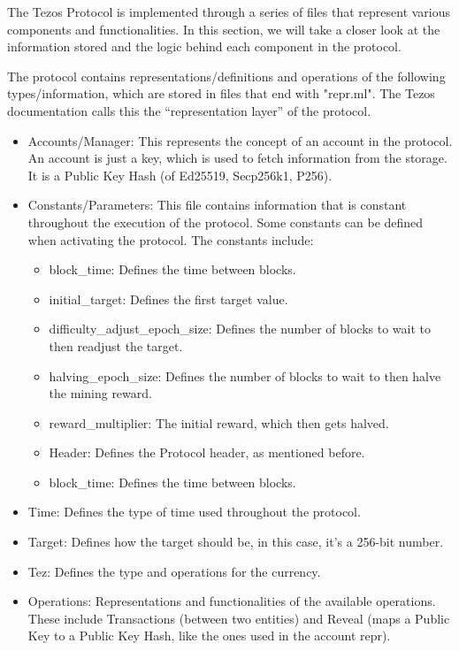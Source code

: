 The Tezos Protocol is implemented through a series of files that represent various components and functionalities. In this section, we will take a closer look at the information stored and the logic behind each component in the protocol.

The protocol contains representations/definitions and operations of the following types/information, which are stored in files that end with "repr.ml". The Tezos documentation calls this the ``representation layer'' of the protocol.

\begin{itemize}

    \item Accounts/Manager: This represents the concept of an account in the protocol. An account is just a key, which is used to fetch information from the storage. It is a Public Key Hash (of Ed25519, Secp256k1, P256).

    \item Constants/Parameters: This file contains information that is constant throughout the execution of the protocol. Some constants can be defined when activating the protocol. The constants include:

        \begin{itemize}
            \item block\_time: Defines the time between blocks.
            \item initial\_target: Defines the first target value.
            \item difficulty\_adjust\_epoch\_size: Defines the number of blocks to wait to then readjust the target.
            \item halving\_epoch\_size: Defines the number of blocks to wait to then halve the mining reward.
            \item reward\_multiplier: The initial reward, which then gets halved.
            \item Header: Defines the Protocol header, as mentioned before.
            \item block\_time: Defines the time between blocks.
        \end{itemize}

    \item Time: Defines the type of time used throughout the protocol.

    \item Target: Defines how the target should be, in this case, it's a 256-bit number.

    \item Tez: Defines the type and operations for the currency.

    \item Operations: Representations and functionalities of the available operations. These include Transactions (between two entities) and Reveal (maps a Public Key to a Public Key Hash, like the ones used in the account repr).

\end{itemize}

